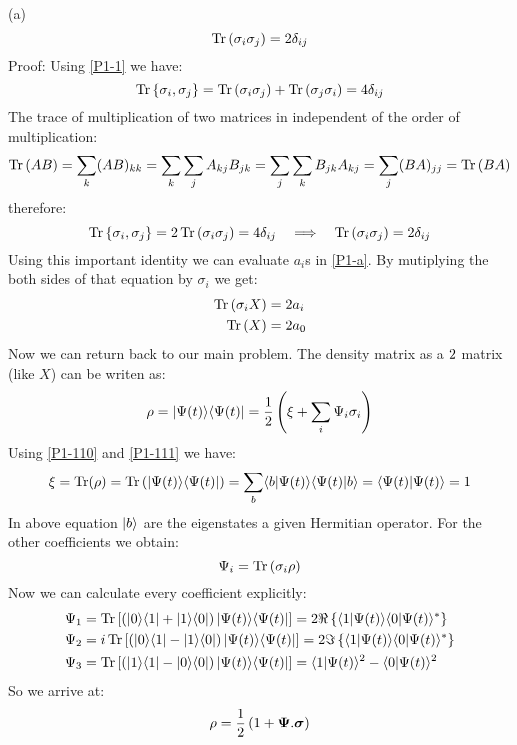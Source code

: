 \begin{homeworkProblem}
\begin{homeworkSection}{(a)}
\begin{equation}
\operatorname{Tr}\left(\sigma_i\sigma_j\right)=2\delta_{ij}
\end{equation}
Proof:
Using \eqref{P1-1} we have:
\begin{equation}
\operatorname{Tr}\left\{\sigma_i,\sigma_j\right\}=\operatorname{Tr}\left(\sigma_i\sigma_j\right)+\operatorname{Tr}\left(\sigma_j\sigma_i\right)=4\delta_{ij}
\end{equation}
The trace of multiplication of two matrices in independent of the order of multiplication:
\begin{equation}
\operatorname{Tr}\left(AB\right)=\sum_{k}(AB)_{kk}=\sum_{k}\sum_j A_{kj}B_{jk}=\sum_{j}\sum_k B_{jk}A_{kj}=\sum_{j}(BA)_{jj}=\operatorname{Tr}\left(BA\right)
\end{equation}
therefore:
\begin{equation}
\operatorname{Tr}\left\{\sigma_i,\sigma_j\right\}=2\operatorname{Tr}\left(\sigma_i\sigma_j\right)=4\delta_{ij}\quad\Longrightarrow\quad \operatorname{Tr}\left(\sigma_i\sigma_j\right)=2\delta_{ij}
\end{equation}
Using this important identity we can evaluate $a_i$s in \eqref{P1-a}. By mutiplying the both sides of that equation by $\sigma_i$ we get:
\begin{align}
\operatorname{Tr}\left(\sigma_i X\right)&=2 a_i\label{P1-110}\\
\operatorname{Tr}\left(X\right)&=2a_0\label{P1-111}
\end{align}
Now we can return back to our main problem. The density matrix as a $2\time 2$ matrix (like $X$) can be writen as:
\begin{equation}
\rho=|\Psi(t)\rangle\langle \Psi(t)|=\frac{1}{2}\left(\xi+\sum_i \Psi_i\sigma_i\right)
\end{equation}
Using \eqref{P1-110} and \eqref{P1-111} we have:
\begin{equation}
\xi=\operatorname{Tr}(\rho)=\operatorname{Tr}\left(|\Psi(t)\rangle\langle \Psi(t)|\right)=\sum_{b}\langle b|\Psi(t)\rangle\langle\Psi(t)|b\rangle=\langle\Psi(t)|\Psi(t)\rangle=1
\end{equation}
In above equation $|b\rangle$ are the eigenstates a given Hermitian operator. For the other coefficients we obtain:
\begin{equation}
\Psi_i=\operatorname{Tr}\left(\sigma_i\rho\right)
\end{equation}
Now we can calculate every coefficient explicitly:
\begin{align}
&\Psi_1=\operatorname{Tr}\left[\left(|0\rangle\langle 1|+|1\rangle\langle 0|\right)|\Psi(t)\rangle\langle \Psi(t)|\right]=2\Re\left\{\langle1|\Psi(t)\rangle\langle0|\Psi(t)\rangle^*\right\}\\
&\Psi_2=i\operatorname{Tr}\left[\left(|0\rangle\langle 1|-|1\rangle\langle 0|\right)|\Psi(t)\rangle\langle \Psi(t)|\right]=2\Im\left\{\langle1|\Psi(t)\rangle\langle0|\Psi(t)\rangle^*\right\}\\
&\Psi_3=\operatorname{Tr}\left[\left(|1\rangle\langle 1|-|0\rangle\langle 0|\right)|\Psi(t)\rangle\langle \Psi(t)|\right]=\langle1|\Psi(t)\rangle^2-\langle0|\Psi(t)\rangle^2
\end{align}
So we arrive at:
\begin{equation}\label{P1-220}
\rho=\frac{1}{2}\left(1+\mathbf{\Psi}.\boldsymbol{\sigma}\right)
\end{equation}


\end{homeworkSection}
\end{homeworkProblem}
